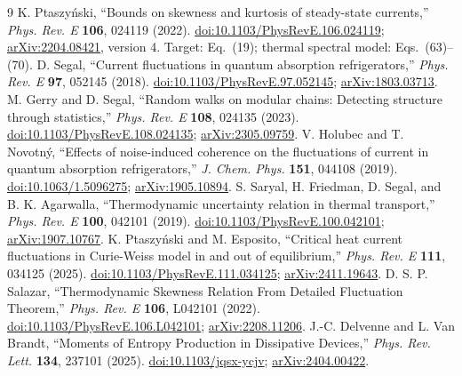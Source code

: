 \documentclass[11pt,a4paper]{article}
\begin{document}
\clearpage
\begingroup\setlength{\parskip}{3pt}
\begin{thebibliography}{9}\setlength{\itemsep}{4pt}
 K. Ptaszy\'nski, ``Bounds on skewness and kurtosis of steady-state currents,'' \emph{Phys. Rev. E} \textbf{106}, 024119 (2022). \href{https://doi.org/10.1103/PhysRevE.106.024119}{doi:10.1103/PhysRevE.106.024119}; \href{https://arxiv.org/abs/2204.08421}{arXiv:2204.08421}, version 4. Target: Eq.~(19); thermal spectral model: Eqs.~(63)--(70).
 D. Segal, ``Current fluctuations in quantum absorption refrigerators,'' \emph{Phys. Rev. E} \textbf{97}, 052145 (2018). \href{https://doi.org/10.1103/PhysRevE.97.052145}{doi:10.1103/PhysRevE.97.052145}; \href{https://arxiv.org/abs/1803.03713}{arXiv:1803.03713}.
 M. Gerry and D. Segal, ``Random walks on modular chains: Detecting structure through statistics,'' \emph{Phys. Rev. E} \textbf{108}, 024135 (2023). \href{https://doi.org/10.1103/PhysRevE.108.024135}{doi:10.1103/PhysRevE.108.024135}; \href{https://arxiv.org/abs/2305.09759}{arXiv:2305.09759}.
 V. Holubec and T. Novotn\'y, ``Effects of noise-induced coherence on the fluctuations of current in quantum absorption refrigerators,'' \emph{J. Chem. Phys.} \textbf{151}, 044108 (2019). \href{https://doi.org/10.1063/1.5096275}{doi:10.1063/1.5096275}; \href{https://arxiv.org/abs/1905.10894}{arXiv:1905.10894}.
 S. Saryal, H. Friedman, D. Segal, and B. K. Agarwalla, ``Thermodynamic uncertainty relation in thermal transport,'' \emph{Phys. Rev. E} \textbf{100}, 042101 (2019). \href{https://doi.org/10.1103/PhysRevE.100.042101}{doi:10.1103/PhysRevE.100.042101}; \href{https://arxiv.org/abs/1907.10767}{arXiv:1907.10767}.
 K. Ptaszy\'nski and M. Esposito, ``Critical heat current fluctuations in Curie-Weiss model in and out of equilibrium,'' \emph{Phys. Rev. E} \textbf{111}, 034125 (2025). \href{https://doi.org/10.1103/PhysRevE.111.034125}{doi:10.1103/PhysRevE.111.034125}; \href{https://arxiv.org/abs/2411.19643}{arXiv:2411.19643}.
 D. S. P. Salazar, ``Thermodynamic Skewness Relation From Detailed Fluctuation Theorem,'' \emph{Phys. Rev. E} \textbf{106}, L042101 (2022). \href{https://doi.org/10.1103/PhysRevE.106.L042101}{doi:10.1103/PhysRevE.106.L042101}; \href{https://arxiv.org/abs/2208.11206}{arXiv:2208.11206}.
 J.-C. Delvenne and L. Van Brandt, ``Moments of Entropy Production in Dissipative Devices,'' \emph{Phys. Rev. Lett.} \textbf{134}, 237101 (2025). \href{https://doi.org/10.1103/jqsx-ycjv}{doi:10.1103/jqsx-ycjv}; \href{https://arxiv.org/abs/2404.00422}{arXiv:2404.00422}.
\end{thebibliography}
\endgroup
\end{document}
